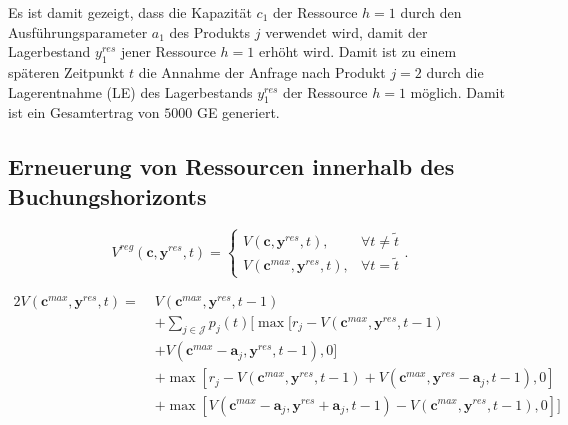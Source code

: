 Es ist damit gezeigt, dass die Kapazität $c_{1}$ der Ressource $h=1$ durch den Ausführungsparameter $a_{1}$ des Produkts $j$ verwendet wird, damit der Lagerbestand $y_{1}^{res}$ jener Ressource $h=1$ erhöht wird. Damit ist zu einem späteren Zeitpunkt $t$ die Annahme der Anfrage nach Produkt $j=2$ durch die Lagerentnahme (LE) des Lagerbestands $y_{1}^{res}$ der Ressource $h=1$ möglich. Damit ist ein Gesamtertrag von $5000$ GE generiert. 

\subsection{Erneuerung von Ressourcen innerhalb des Buchungshorizonts}

\begin{equation}\label{reg}
     V^{reg}(\textbf{c}, \textbf{y}^{res}, t)=\left\{\begin{array}{ll} V(\textbf{c}, \textbf{y}^{res}, t), & \forall t\neq\tilde{t}\\
         V(\textbf{c}^{max}, \textbf{y}^{res}, t), &\forall t=\tilde{t}\end{array}\right. .
\end{equation}

\begin{alignat*}{2}
 V(\textbf{c}^{max}, \textbf{y}^{res}, t) = \;& V(\textbf{c}^{max}, \textbf{y}^{res}, t-1)\\
&+ \sum_{j \in \mathcal{J}}p_{j}(t)[\max[r_{j} - V(\textbf{c}^{max}, \textbf{y}^{res}, t-1)\\
&+ V(\textbf{c}^{max}-\textbf{a}_j, \textbf{y}^{res}, t-1),0] \\
&+ \max[r_{j} - V(\textbf{c}^{max}, \textbf{y}^{res}, t-1) + V(\textbf{c}^{max}, \textbf{y}^{res}-\textbf{a}_j, t-1),0]\\
&+ \max[V(\textbf{c}^{max}-\textbf{a}_j, \textbf{y}^{res}+\textbf{a}_j, t-1) - V(\textbf{c}^{max}, \textbf{y}^{res}, t-1) ,0]]\\
\end{alignat*}

